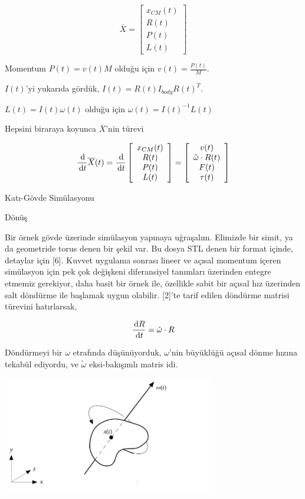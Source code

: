 \documentclass[12pt,fleqn]{article}\usepackage{../../common}
\begin{document}
$$
\overline{X} = \left[\begin{array}{c}
x_{CM}(t) \\ R(t) \\ P(t) \\ L(t)
\end{array}\right]
$$

Momentum $P(t) = v(t) M$ olduğu için $v(t) = \frac{P(t)}{M}$.

$I(t)$'yi yukarıda gördük, $I(t) = R(t) I_{body} R(t)^T$.

$L(t) = I(t) \omega(t)$ olduğu için $\omega(t) = I(t)^{-1} L(t)$

Hepsini biraraya koyunca $\overline{X}$'nin türevi

$$
\frac{\,\mathrm{d}}{\,\mathrm{d} t} \overline{X}(t) =
\frac{\,\mathrm{d}}{\,\mathrm{d} t}
\left[\begin{array}{c}
x_{CM}(t) \\ R(t) \\ P(t) \\ L(t)
\end{array}\right]
=
\left[\begin{array}{c}
v(t) \\ \tilde \omega \cdot R(t) \\ F(t) \\ \tau(t)
\end{array}\right]
$$

Katı-Gövde Simülasyonu

Dönüş

Bir örnek gövde üzerinde simülasyon yapmaya uğraşalım. Elimizde bir simit, ya da
geometride torus denen bir şekil var. Bu dosya STL denen bir format içinde,
detaylar için [6]. Kuvvet uygulama sonrası lineer ve açısal momentum içeren
simülasyon için pek çok değişkeni diferansiyel tanımları üzerinden entegre
etmemiz gerekiyor, daha basit bir örnek ile, özellikle sabit bir açısal hız
üzerinden salt döndürme ile başlamak uygun olabilir. [2]'te tarif edilen
döndürme matrisi türevini hatırlarsak,

$$
\frac{\,\mathrm{d} R}{\,\mathrm{d} t} = \tilde \omega \cdot R
$$

Döndürmeyi bir $\omega$ etrafında düşünüyorduk, $\omega$'nin büyüklüğü
açısal dönme hızına tekabül ediyordu, ve $\tilde \omega$ eksi-bakışımlı
matris idi.

\includegraphics[width=25em]{compscieng_bpp32sim_rigbod_01.png}
\end{document}
